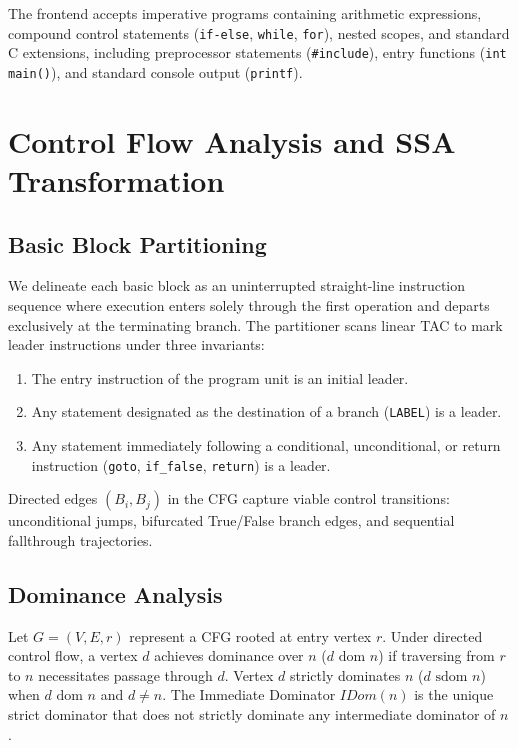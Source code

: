 \documentclass{ieeeaccess}
\begin{document}
The frontend accepts imperative programs containing arithmetic expressions, compound control statements (\texttt{if-else}, \texttt{while}, \texttt{for}), nested scopes, and standard C extensions, including preprocessor statements (\texttt{\#include}), entry functions (\texttt{int main()}), and standard console output (\texttt{printf}). %

\section{Control Flow Analysis and SSA Transformation}
\label{sec:cfg_ssa} %

\subsection{Basic Block Partitioning}
We delineate each basic block as an uninterrupted straight-line instruction sequence where execution enters solely through the first operation and departs exclusively at the terminating branch. The partitioner scans linear TAC to mark leader instructions under three invariants:
\begin{enumerate}
    \item The entry instruction of the program unit is an initial leader.
    \item Any statement designated as the destination of a branch (\texttt{LABEL}) is a leader.
    \item Any statement immediately following a conditional, unconditional, or return instruction (\texttt{goto}, \texttt{if\_false}, \texttt{return}) is a leader.
\end{enumerate}

Directed edges $(B_i, B_j)$ in the CFG capture viable control transitions: unconditional jumps, bifurcated True/False branch edges, and sequential fallthrough trajectories.

\subsection{Dominance Analysis}
Let $G = (V, E, r)$ represent a CFG rooted at entry vertex $r$. Under directed control flow, a vertex $d$ achieves dominance over $n$ ($d \text{ dom } n$) if traversing from $r$ to $n$ necessitates passage through $d$. Vertex $d$ strictly dominates $n$ ($d \text{ sdom } n$) when $d \text{ dom } n$ and $d \neq n$. The Immediate Dominator $IDom(n)$ is the unique strict dominator that does not strictly dominate any intermediate dominator of $n$.
\end{document}
